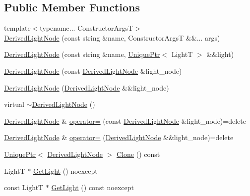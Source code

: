 \subsection*{Public Member Functions}
\begin{DoxyCompactItemize}
\item 
{\footnotesize template$<$typename... Constructor\+ArgsT$>$ }\\\hyperlink{classmage_1_1_derived_light_node_a64003a60d92c245c8ad247bb16724852}{Derived\+Light\+Node} (const string \&name, Constructor\+ArgsT \&\&... args)
\item 
\hyperlink{classmage_1_1_derived_light_node_ab3e68ce3299581459843e8ad12f18464}{Derived\+Light\+Node} (const string \&name, \hyperlink{namespacemage_a8c307fbcc33bce9b7f2aa4c26c3b95cf}{Unique\+Ptr}$<$ LightT $>$ \&\&light)
\item 
\hyperlink{classmage_1_1_derived_light_node_a719b8fe088b93a7ecfb6d21b99cc170b}{Derived\+Light\+Node} (const \hyperlink{classmage_1_1_derived_light_node}{Derived\+Light\+Node} \&light\+\_\+node)
\item 
\hyperlink{classmage_1_1_derived_light_node_af99017273f3f8bedcbd3842c31e4ecc4}{Derived\+Light\+Node} (\hyperlink{classmage_1_1_derived_light_node}{Derived\+Light\+Node} \&\&light\+\_\+node)
\item 
virtual \hyperlink{classmage_1_1_derived_light_node_ad4b2371e323d30eda05744237d4dc4eb}{$\sim$\+Derived\+Light\+Node} ()
\item 
\hyperlink{classmage_1_1_derived_light_node}{Derived\+Light\+Node} \& \hyperlink{classmage_1_1_derived_light_node_ad4a81ae2a671d6c278c74dead4660949}{operator=} (const \hyperlink{classmage_1_1_derived_light_node}{Derived\+Light\+Node} \&light\+\_\+node)=delete
\item 
\hyperlink{classmage_1_1_derived_light_node}{Derived\+Light\+Node} \& \hyperlink{classmage_1_1_derived_light_node_a7eabbc97578958f97a7ec11728364eec}{operator=} (\hyperlink{classmage_1_1_derived_light_node}{Derived\+Light\+Node} \&\&light\+\_\+node)=delete
\item 
\hyperlink{namespacemage_a8c307fbcc33bce9b7f2aa4c26c3b95cf}{Unique\+Ptr}$<$ \hyperlink{classmage_1_1_derived_light_node}{Derived\+Light\+Node} $>$ \hyperlink{classmage_1_1_derived_light_node_a38fcbc8d5204f92d0dfd87c1c6d10281}{Clone} () const
\item 
LightT $\ast$ \hyperlink{classmage_1_1_derived_light_node_a1f45fa421b75d663a360bfdd518a1a1d}{Get\+Light} () noexcept
\item 
const LightT $\ast$ \hyperlink{classmage_1_1_derived_light_node_a61ace20169a3924d42abc163ebddc19b}{Get\+Light} () const noexcept
\end{DoxyCompactItemize}
